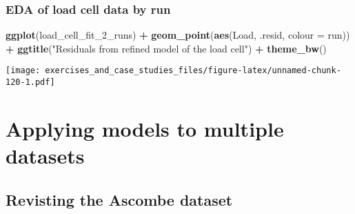 \documentclass[]{book}
\newenvironment{Shaded}{\begin{snugshade}}{\end{snugshade}}
\newcommand{\CommentTok}[1]{\textcolor[rgb]{0.56,0.35,0.01}{\textit{#1}}}
\newcommand{\DataTypeTok}[1]{\textcolor[rgb]{0.13,0.29,0.53}{#1}}
\newcommand{\DecValTok}[1]{\textcolor[rgb]{0.00,0.00,0.81}{#1}}
\newcommand{\KeywordTok}[1]{\textcolor[rgb]{0.13,0.29,0.53}{\textbf{#1}}}
\newcommand{\NormalTok}[1]{#1}
\newcommand{\OperatorTok}[1]{\textcolor[rgb]{0.81,0.36,0.00}{\textbf{#1}}}
\newcommand{\StringTok}[1]{\textcolor[rgb]{0.31,0.60,0.02}{#1}}
\theoremstyle{definition}
\theoremstyle{definition}
\theoremstyle{definition}
\theoremstyle{remark}
\begin{document}
\hypertarget{eda-of-load-cell-data-by-run}{%
\subsubsection{EDA of load cell data by
run}\label{eda-of-load-cell-data-by-run}}

\begin{Shaded}
\begin{Highlighting}[]
\KeywordTok{ggplot}\NormalTok{(load_cell_fit_}\DecValTok{2}\NormalTok{_runs) }\OperatorTok{+}
\StringTok{  }\KeywordTok{geom_point}\NormalTok{(}\KeywordTok{aes}\NormalTok{(Load, .resid, }\DataTypeTok{colour =}\NormalTok{ run)) }\OperatorTok{+}
\StringTok{  }\KeywordTok{ggtitle}\NormalTok{(}\StringTok{"Residuals from refined model of the load cell"}\NormalTok{) }\OperatorTok{+}
\StringTok{  }\KeywordTok{theme_bw}\NormalTok{()}
\end{Highlighting}
\end{Shaded}

\texttt{[image: exercises\_and\_case\_studies\_files/figure-latex/unnamed-chunk-120-1.pdf]}

\hypertarget{applying-models-to-multiple-datasets}{%
\section{Applying models to multiple
datasets}\label{applying-models-to-multiple-datasets}}

\hypertarget{revisting-the-ascombe-dataset}{%
\subsection{Revisting the Ascombe
dataset}\label{revisting-the-ascombe-dataset}}

\begin{Shaded}
\end{Shaded}
\end{document}
